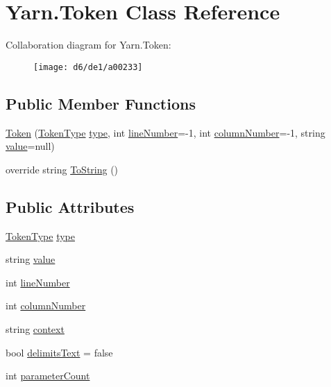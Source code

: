 \hypertarget{a00079}{\section{Yarn.\-Token Class Reference}
\label{a00079}
}


Collaboration diagram for Yarn.\-Token\-:
\nopagebreak
\begin{figure}[H]
\begin{center}
\leavevmode
\texttt{[image: d6/de1/a00233]}
\end{center}
\end{figure}
\subsection*{Public Member Functions}
\begin{DoxyCompactItemize}
\item 
\hyperlink{a00079_a5b307a925a1606db47866b31cea71386}{Token} (\hyperlink{a00026_a301aa7c866593a5b625a8fc158bbeace}{Token\-Type} \hyperlink{a00079_a471a25da67fda0524f2375f9a882aafa}{type}, int \hyperlink{a00079_a80fe710713201bb793a41452e314a721}{line\-Number}=-\/1, int \hyperlink{a00079_a9a0f0a8a7ab1e90ab48f15192323ffca}{column\-Number}=-\/1, string \hyperlink{a00079_a3df6b32d6190a639619a3f064c2154e2}{value}=null)
\item 
override string \hyperlink{a00079_abf676a737679ec2fb1dffd75dc4d7976}{To\-String} ()
\end{DoxyCompactItemize}
\subsection*{Public Attributes}
\begin{DoxyCompactItemize}
\item 
\hyperlink{a00026_a301aa7c866593a5b625a8fc158bbeace}{Token\-Type} \hyperlink{a00079_a471a25da67fda0524f2375f9a882aafa}{type}
\item 
string \hyperlink{a00079_a3df6b32d6190a639619a3f064c2154e2}{value}
\item 
int \hyperlink{a00079_a80fe710713201bb793a41452e314a721}{line\-Number}
\item 
int \hyperlink{a00079_a9a0f0a8a7ab1e90ab48f15192323ffca}{column\-Number}
\item 
string \hyperlink{a00079_a089d248c904a6e8366b81c2c47ff5af8}{context}
\item 
bool \hyperlink{a00079_af15d26fa4e6f276ab58ff66d3c4203da}{delimits\-Text} = false
\item 
int \hyperlink{a00079_adf11c0d29b66935a8d8109d6308d0488}{parameter\-Count}
\end{DoxyCompactItemize}


